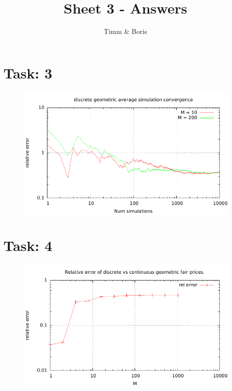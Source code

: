 \documentclass{article}
\title{Sheet 3 - Answers}
\author{Timm \& Boris}
\begin{document}
\maketitle



\section*{Task: 3}

% 
\begin{figure}[htbp]
  \centering
     \includegraphics[width=1.0\textwidth]{../Task03/sh3_task3_convergence_plot.pdf}
\end{figure}
\newpage
\section*{Task: 4}
\begin{figure}[htbp]
  \centering
     \includegraphics[width=1.0\textwidth]{../Task04/sh3_task4_convergence_plot.pdf}
\end{figure}
\end{document}

